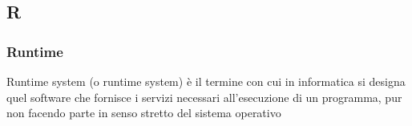 \subsection*{\textbf{\hfill \Huge{R} \hfill}} 
\subsubsection*{Runtime}
Runtime system (o runtime system) è il termine con cui in informatica si designa quel software che fornisce i servizi necessari all'esecuzione di un programma, pur non facendo parte in senso stretto del sistema operativo
